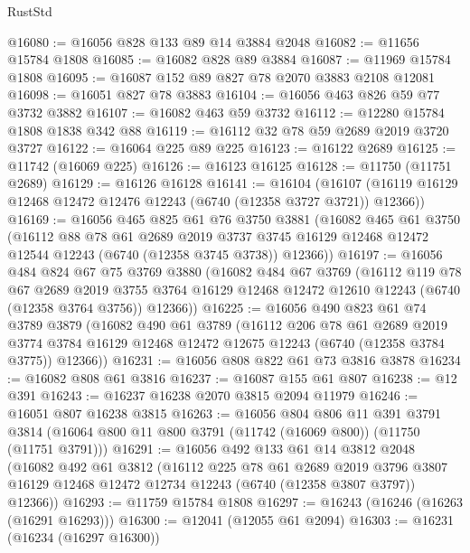\begin{lexlean}{RustStd}
\begin{coremodule}
@16080 := @16056 @828 @133 @89 @14 @3884 @2048
@16082 := @11656 @15784 @1808
@16085 := @16082 @828 @89 @3884
@16087 := @11969 @15784 @1808
@16095 := @16087 @152 @89 @827 @78 @2070 @3883 @2108 @12081
@16098 := @16051 @827 @78 @3883
@16104 := @16056 @463 @826 @59 @77 @3732 @3882
@16107 := @16082 @463 @59 @3732
@16112 := @12280 @15784 @1808 @1838 @342 @88
@16119 := @16112 @32 @78 @59 @2689 @2019 @3720 @3727
@16122 := @16064 @225 @89 @225
@16123 := @16122 @2689
@16125 := @11742 (@16069 @225)
@16126 := @16123 @16125
@16128 := @11750 (@11751 @2689)
@16129 := @16126 @16128
@16141 := @16104
    (@16107 (@16119 @16129 @12468 @12472 @12476 @12243 (@6740 (@12358 @3727 @3721)) @12366))
@16169 := @16056
    @465
    @825
    @61
    @76
    @3750
    @3881
    (@16082
      @465
      @61
      @3750
      (@16112
        @88
        @78
        @61
        @2689
        @2019
        @3737
        @3745
        @16129
        @12468
        @12472
        @12544
        @12243
        (@6740 (@12358 @3745 @3738))
        @12366))
@16197 := @16056
    @484
    @824
    @67
    @75
    @3769
    @3880
    (@16082
      @484
      @67
      @3769
      (@16112
        @119
        @78
        @67
        @2689
        @2019
        @3755
        @3764
        @16129
        @12468
        @12472
        @12610
        @12243
        (@6740 (@12358 @3764 @3756))
        @12366))
@16225 := @16056
    @490
    @823
    @61
    @74
    @3789
    @3879
    (@16082
      @490
      @61
      @3789
      (@16112
        @206
        @78
        @61
        @2689
        @2019
        @3774
        @3784
        @16129
        @12468
        @12472
        @12675
        @12243
        (@6740 (@12358 @3784 @3775))
        @12366))
@16231 := @16056 @808 @822 @61 @73 @3816 @3878
@16234 := @16082 @808 @61 @3816
@16237 := @16087 @155 @61 @807
@16238 := @12 @391
@16243 := @16237 @16238 @2070 @3815 @2094 @11979
@16246 := @16051 @807 @16238 @3815
@16263 := @16056
    @804
    @806
    @11
    @391
    @3791
    @3814
    (@16064 @800 @11 @800 @3791 (@11742 (@16069 @800)) (@11750 (@11751 @3791)))
@16291 := @16056
    @492
    @133
    @61
    @14
    @3812
    @2048
    (@16082
      @492
      @61
      @3812
      (@16112
        @225
        @78
        @61
        @2689
        @2019
        @3796
        @3807
        @16129
        @12468
        @12472
        @12734
        @12243
        (@6740 (@12358 @3807 @3797))
        @12366))
@16293 := @11759 @15784 @1808
@16297 := @16243 (@16246 (@16263 (@16291 @16293)))
@16300 := @12041 (@12055 @61 @2094)
@16303 := @16231 (@16234 (@16297 @16300))

\end{coremodule}
\end{lexlean}
